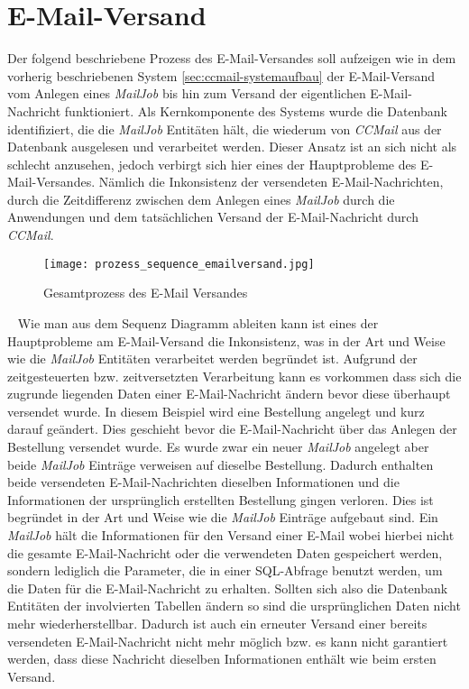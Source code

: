 \section{E-Mail-Versand}
\label{sec:ccmail-email-versand}
Der folgend beschriebene Prozess des E-Mail-Versandes soll aufzeigen wie in dem vorherig beschriebenen System \ref{sec:ccmail-systemaufbau} der E-Mail-Versand vom Anlegen eines \emph{MailJob} bis hin zum Versand der eigentlichen E-Mail-Nachricht funktioniert. Als Kernkomponente des Systems wurde die Datenbank identifiziert, die die \emph{MailJob} Entitäten hält, die wiederum von \emph{CCMail} aus der Datenbank ausgelesen und verarbeitet werden. Dieser Ansatz ist an sich nicht als schlecht anzusehen, jedoch verbirgt sich hier eines der Hauptprobleme des E-Mail-Versandes. Nämlich die Inkonsistenz der versendeten E-Mail-Nachrichten, durch die Zeitdifferenz zwischen dem Anlegen eines \emph{MailJob} durch die Anwendungen und dem tatsächlichen Versand der E-Mail-Nachricht durch \emph{CCMail}.
\begin{figure}[h]
\centering
\texttt{[image: prozess\_sequence\_emailversand.jpg]}
\caption{Gesamtprozess des E-Mail Versandes}
\label{fig:sequence-diagramm-gesamtprozess}
\end{figure}
\ \newline
Wie man aus dem Sequenz Diagramm ableiten kann ist eines der Hauptprobleme am E-Mail-Versand die Inkonsistenz, was in der Art und Weise wie die \emph{MailJob} Entitäten verarbeitet werden begründet ist. Aufgrund der zeitgesteuerten bzw. zeitversetzten Verarbeitung kann es vorkommen dass sich die zugrunde liegenden Daten einer E-Mail-Nachricht ändern bevor diese überhaupt versendet wurde. In diesem Beispiel wird eine Bestellung angelegt und kurz darauf geändert. Dies geschieht bevor die E-Mail-Nachricht über das Anlegen der Bestellung versendet wurde. Es wurde zwar ein neuer \emph{MailJob} angelegt aber beide \emph{MailJob} Einträge verweisen auf dieselbe Bestellung. Dadurch enthalten beide versendeten E-Mail-Nachrichten dieselben Informationen und die Informationen der ursprünglich erstellten Bestellung gingen verloren. 
\newline
\newline
Dies ist begründet in der Art und Weise wie die \emph{MailJob} Einträge aufgebaut sind. Ein \emph{MailJob} hält die Informationen für den Versand einer E-Mail wobei hierbei nicht die gesamte E-Mail-Nachricht oder die verwendeten Daten gespeichert werden, sondern lediglich die Parameter, die in einer SQL-Abfrage benutzt werden, um die Daten für die E-Mail-Nachricht zu erhalten. Sollten sich also die Datenbank Entitäten der involvierten Tabellen ändern so sind die ursprünglichen Daten nicht mehr wiederherstellbar. Dadurch ist auch ein erneuter Versand einer bereits versendeten E-Mail-Nachricht nicht mehr möglich bzw. es kann nicht garantiert werden, dass diese Nachricht dieselben Informationen enthält wie beim ersten Versand.
